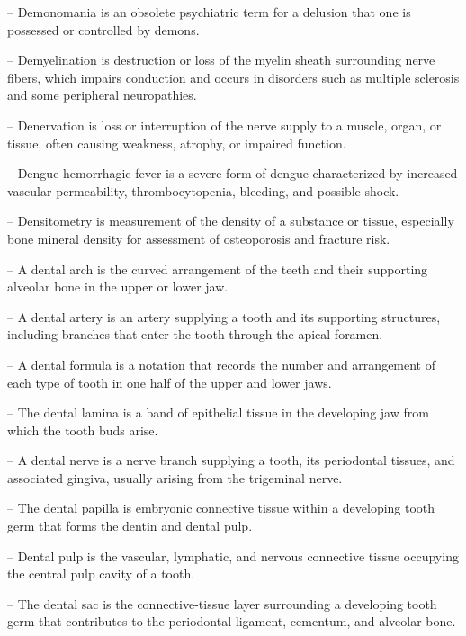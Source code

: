 -- Demonomania is an obsolete psychiatric term for a delusion that one is possessed or controlled by demons.

-- Demyelination is destruction or loss of the myelin sheath surrounding nerve fibers, which impairs conduction and occurs in disorders such as multiple sclerosis and some peripheral neuropathies.

-- Denervation is loss or interruption of the nerve supply to a muscle, organ, or tissue, often causing weakness, atrophy, or impaired function.

-- Dengue hemorrhagic fever is a severe form of dengue characterized by increased vascular permeability, thrombocytopenia, bleeding, and possible shock.

-- Densitometry is measurement of the density of a substance or tissue, especially bone mineral density for assessment of osteoporosis and fracture risk.

-- A dental arch is the curved arrangement of the teeth and their supporting alveolar bone in the upper or lower jaw.

-- A dental artery is an artery supplying a tooth and its supporting structures, including branches that enter the tooth through the apical foramen.

-- A dental formula is a notation that records the number and arrangement of each type of tooth in one half of the upper and lower jaws.

-- The dental lamina is a band of epithelial tissue in the developing jaw from which the tooth buds arise.

-- A dental nerve is a nerve branch supplying a tooth, its periodontal tissues, and associated gingiva, usually arising from the trigeminal nerve.

-- The dental papilla is embryonic connective tissue within a developing tooth germ that forms the dentin and dental pulp.

-- Dental pulp is the vascular, lymphatic, and nervous connective tissue occupying the central pulp cavity of a tooth.

-- The dental sac is the connective-tissue layer surrounding a developing tooth germ that contributes to the periodontal ligament, cementum, and alveolar bone.

